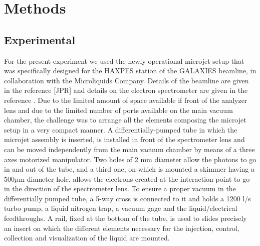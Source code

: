 \section{Methods} \label{sec:methods}
\subsection{Experimental}

For the present experiment we used the newly operational microjet setup that was specifically designed for the HAXPES station of the GALAXIES beamline, in collaboration with the Microliquids Company. Details of the beamline are given in the reference [JPR] and details on the electron spectrometer are given in the reference \citep{ceolin15:022502,ceolin13:188}. Due to the limited amount of space available if front of the analyzer lens and due to the limited number of ports available on the main vacuum chamber, the challenge was to arrange all the elements composing the microjet setup in a very compact manner. A differentially-pumped tube in which the microjet assembly is inserted, is installed in front of the spectrometer lens and can be moved independently from the main vacuum chamber by means of a three axes motorized manipulator. Two holes of 2 mm diameter allow the photons to go in and out of the tube, and a third one, on which is mounted a skimmer having a 500$\mu$m diameter hole, allows the electrons created at the interaction point to go in the direction of the spectrometer lens. To ensure a proper vacuum in the differentially pumped tube, a 5-way cross is connected to it and holds a 1200 l/s turbo pump, a liquid nitrogen trap, a vacuum gage and the liquid/electrical feedthroughs. A rail, fixed at the bottom of the tube, is used to slides precisely an insert on which the different elements necessary for the injection, control, collection and visualization of the liquid are mounted.


